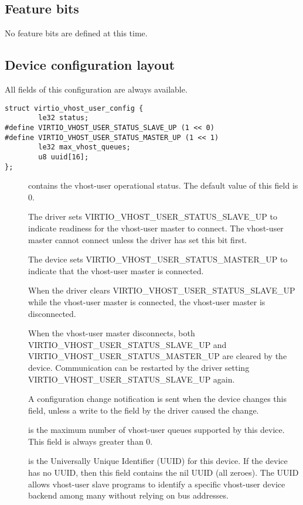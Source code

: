 \subsection{Feature bits}\label{sec:Device Types / Vhost-user Device Backend / Feature bits}

No feature bits are defined at this time.

\subsection{Device configuration layout}\label{sec:Device Types / Vhost-user Device Backend / Device configuration layout}

All fields of this configuration are always available.

\begin{lstlisting}
struct virtio_vhost_user_config {
        le32 status;
#define VIRTIO_VHOST_USER_STATUS_SLAVE_UP (1 << 0)
#define VIRTIO_VHOST_USER_STATUS_MASTER_UP (1 << 1)
        le32 max_vhost_queues;
        u8 uuid[16];
};
\end{lstlisting}

\begin{description}
\item[] contains the vhost-user operational status.  The default
    value of this field is 0.

    The driver sets VIRTIO_VHOST_USER_STATUS_SLAVE_UP to indicate readiness for
    the vhost-user master to connect.  The vhost-user master cannot connect
    unless the driver has set this bit first.

    The device sets VIRTIO_VHOST_USER_STATUS_MASTER_UP to indicate that the
    vhost-user master is connected.

    When the driver clears VIRTIO_VHOST_USER_STATUS_SLAVE_UP while the
    vhost-user master is connected, the vhost-user master is disconnected.

    When the vhost-user master disconnects, both
    VIRTIO_VHOST_USER_STATUS_SLAVE_UP and VIRTIO_VHOST_USER_STATUS_MASTER_UP
    are cleared by the device.  Communication can be restarted by the driver
    setting VIRTIO_VHOST_USER_STATUS_SLAVE_UP again.

    A configuration change notification is sent when the device changes
    this field, unless a write to the field by the driver caused the change.

\item[] is the maximum number of vhost-user queues
    supported by this device.  This field is always greater than 0.

\item[] is the Universally Unique Identifier (UUID) for this
    device.  If the device has no UUID, then this field contains the nil
    UUID (all zeroes).  The UUID allows vhost-user slave programs to identify a
    specific vhost-user device backend among many without relying on bus
    addresses.
\end{description}


